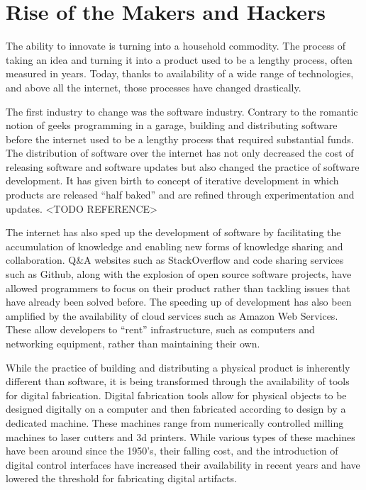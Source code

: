 \section{Rise of the Makers and Hackers}

The ability to innovate is turning into a household commodity. The process of taking an idea and turning it into a product used to be a lengthy process, often measured in years. Today, thanks to availability of a wide range of technologies, and above all the internet, those processes have changed drastically. 

The first industry to change was the software industry. Contrary to the romantic notion of geeks programming in a garage, building and distributing software before the internet used to be a lengthy process that required substantial funds. The distribution of software over the internet has not only decreased the cost of releasing software and software updates but also changed the practice of software development. It has given birth to concept of iterative development in which products are released ``half baked'' and are refined through experimentation and updates. <TODO REFERENCE>

The internet has also sped up the development of software by facilitating the accumulation of knowledge and enabling new forms of knowledge sharing and collaboration. Q\&A websites such as StackOverflow\cite{stackoverflow} and code sharing services such as Github\cite{github}, along with the explosion of open source software projects, have allowed programmers to focus on their product rather than tackling issues that have already been solved before. The speeding up of development has also been amplified by the availability of cloud services such as Amazon Web Services\cite{aws}. These allow developers to ``rent'' infrastructure, such as computers and networking equipment, rather than maintaining their own.

While the practice of building and distributing a physical product is inherently different than software, it is being transformed through the availability of tools for digital fabrication. Digital fabrication tools allow for physical objects to be designed digitally on a computer and then fabricated according to design by a dedicated machine. These machines range from numerically controlled milling machines to laser cutters and 3d printers. While various types of these machines have been around since the 1950's, their falling cost, and the introduction of digital control interfaces have increased their availability in recent years and have lowered the threshold for fabricating digital artifacts.

